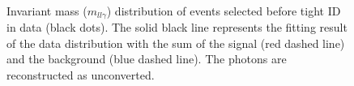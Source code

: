 \begin{figure}[htbp]
    \centering
	 \\
	\begin{tcolorbox}[colback=black!5!white,colframe=white!75!black]
    \caption{Invariant mass ($m_{ll\gamma}$) distribution of events selected before tight ID in data (black dots). The solid black line represents the fitting result of the data distribution with the sum of the signal (red dashed line) and the background (blue dashed line). The photons are reconstructed as unconverted.}
    \label{Eff:TemplateFit:UnC:Before}
    \end{tcolorbox}
    
\end{figure}


